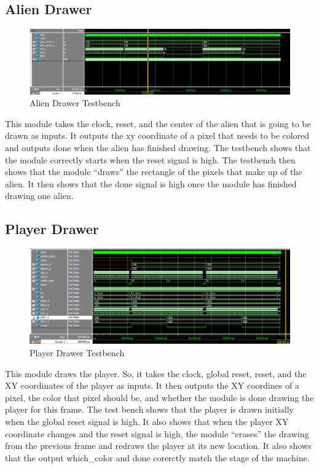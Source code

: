 \documentclass[11pt, titlepage]{article}
\begin{document}
        \subsection{Alien Drawer}
            \begin{figure}[H]
                \centering
                \includegraphics[scale = 0.49]{Images/Testbench Alien Drawer.png}
                \caption{Alien Drawer Testbench}
            \end{figure}
            This module takes the clock, reset, and the center of the alien that is going to be drawn as inputs. It outputs the xy coordinate of a pixel that needs to be colored and outputs done when the alien has finished drawing. The testbench shows that the module correctly starts when the reset signal is high. The testbench then shows that the module ``draws'' the rectangle of the pixels that make up of the alien. It then shows that the done signal is high once the module has finished drawing one alien.
        \subsection{Player Drawer}
            \begin{figure}[H]
                \centering
                \includegraphics[scale = 0.53]{Images/Testbench Player Drawer.png}
                \caption{Player Drawer Testbench}
            \end{figure}
            This module draws the player. So, it takes the clock, global reset, reset, and the XY coordinates of the player as inputs. It then outputs the XY coordines of a pixel, the color that pixel should be, and whether the module is done drawing the player for this frame. The test bench shows that the player is drawn initially when the global reset signal is high. It also shows that when the player XY coordinate changes and the reset signal is high, the module ``erases'' the drawing from the previous frame and redraws the player at its new location. It also shows that the output which\_color and done corerctly match the stage of the machine.
\end{document}
